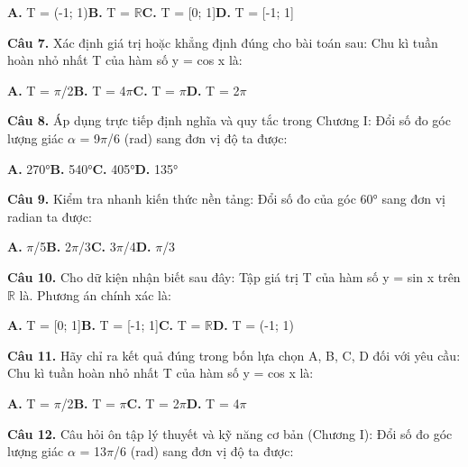 \documentclass[11pt,a4paper]{article}
\begin{document}
\hspace*{1.5em}\textbf{A.} T = (-1; 1)\quad\quad \textbf{B.} T = $\mathbb{R}$\quad\quad \textbf{C.} T = [0; 1]\quad\quad \textbf{D.} T = [-1; 1]\par\vspace{2pt}
\textbf{\color{primary} Câu 7.} Xác định giá trị hoặc khẳng định đúng cho bài toán sau: Chu kì tuần hoàn nhỏ nhất T của hàm số y = cos x là:\par
\hspace*{1.5em}\textbf{A.} T = $\pi$/2\quad\quad \textbf{B.} T = 4$\pi$\quad\quad \textbf{C.} T = $\pi$\quad\quad \textbf{D.} T = 2$\pi$\par\vspace{2pt}
\textbf{\color{primary} Câu 8.} Áp dụng trực tiếp định nghĩa và quy tắc trong Chương I: Đổi số đo góc lượng giác $\alpha$ = 9$\pi$/6 (rad) sang đơn vị độ ta được:\par
\hspace*{1.5em}\textbf{A.} 270°\quad\quad \textbf{B.} 540°\quad\quad \textbf{C.} 405°\quad\quad \textbf{D.} 135°\par\vspace{2pt}
\textbf{\color{primary} Câu 9.} Kiểm tra nhanh kiến thức nền tảng: Đổi số đo của góc 60° sang đơn vị radian ta được:\par
\hspace*{1.5em}\textbf{A.} $\pi$/5\quad\quad \textbf{B.} 2$\pi$/3\quad\quad \textbf{C.} 3$\pi$/4\quad\quad \textbf{D.} $\pi$/3\par\vspace{2pt}
\textbf{\color{primary} Câu 10.} Cho dữ kiện nhận biết sau đây: Tập giá trị T của hàm số y = sin x trên $\mathbb{R}$ là. Phương án chính xác là:\par
\hspace*{1.5em}\textbf{A.} T = [0; 1]\quad\quad \textbf{B.} T = [-1; 1]\quad\quad \textbf{C.} T = $\mathbb{R}$\quad\quad \textbf{D.} T = (-1; 1)\par\vspace{2pt}
\textbf{\color{primary} Câu 11.} Hãy chỉ ra kết quả đúng trong bốn lựa chọn A, B, C, D đối với yêu cầu: Chu kì tuần hoàn nhỏ nhất T của hàm số y = cos x là:\par
\hspace*{1.5em}\textbf{A.} T = $\pi$/2\quad\quad \textbf{B.} T = $\pi$\quad\quad \textbf{C.} T = 2$\pi$\quad\quad \textbf{D.} T = 4$\pi$\par\vspace{2pt}
\textbf{\color{primary} Câu 12.} Câu hỏi ôn tập lý thuyết và kỹ năng cơ bản (Chương I): Đổi số đo góc lượng giác $\alpha$ = 13$\pi$/6 (rad) sang đơn vị độ ta được:\par
\end{document}
